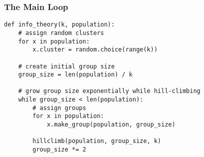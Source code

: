 \documentclass{beamer}
\begin{document}
\begin{frame}[fragile]
\frametitle{The Main Loop}
\begin{verbatim}
def info_theory(k, population):
    # assign random clusters
    for x in population:
        x.cluster = random.choice(range(k))

    # create initial group size
    group_size = len(population) / k
   
    # grow group size exponentially while hill-climbing
    while group_size < len(population):
        # assign groups
        for x in population:
            x.make_group(population, group_size)

        hillclimb(population, group_size, k)
        group_size *= 2
\end{verbatim}
\end{frame}

\frame{\tableofcontents}
\end{document}

